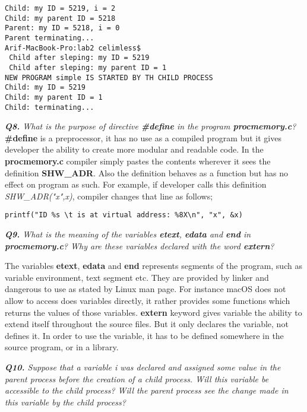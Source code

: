 \documentclass[11pt]{article}
\begin{document}
\begin{lstlisting}[frame=tlrb]
Child: my ID = 5219, i = 2
Child: my parent ID = 5218
Parent: my ID = 5218, i = 0
Parent terminating...
Arif-MacBook-Pro:lab2 celimless$ 
 Child after sleping: my ID = 5219
 Child after sleping: my parent ID = 1
NEW PROGRAM simple IS STARTED BY TH CHILD PROCESS
Child: my ID = 5219
Child: my parent ID = 1
Child: terminating...
\end{lstlisting}
\vspace{5mm}
\textit{\textbf{Q8.} What is the purpose of directive \textbf{\#define} in the program \textbf{procmemory.c}?}
\vspace{5mm}
\textbf{\#define} is a preprocessor, it has no use as a compiled program but it gives developer the ability to create more modular and readable code. In the \textbf{procmemory.c} compiler simply pastes the contents wherever it sees the definition \textbf{SHW\_ADR}. Also the definition behaves as a function but has no effect on program as such.
For example, if developer calls this definition \textit{SHW\_ADR("x",x)}, compiler changes that line as follows; 
\begin{lstlisting}[frame=tlrb]
printf("ID %s \t is at virtual address: %8X\n", "x", &x)
\end{lstlisting}
\vspace{5mm}
\textit{\textbf{Q9.} What is the meaning of the variables \textbf{etext}, \textbf{edata} and \textbf{end} in \textbf{procmemory.c}? Why are these variables declared with the word \textbf{extern}?}
\vspace{3mm}

The variables \textbf{etext}, \textbf{edata} and \textbf{end} represents segments of the program, such as variable environment, text segment etc. They are provided by linker and dangerous to use as stated by Linux man page. For instance macOS does not allow to access does variables directly, it rather provides some functions which returns the values of those variables.
\textbf{extern} keyword gives variable the ability to extend itself throughout the source files. But it only declares the variable, not defines it. In order to use the variable, it has to be defined somewhere in the source program, or in a library.
\vspace{5mm}

\textit{\textbf{Q10.} Suppose that a variable i was declared and assigned some value in the parent process before the creation of a child process. Will this variable be accessible to the child process? Will the parent process see the change made in this variable by the child process?}
\vspace{5mm}
\end{document}
